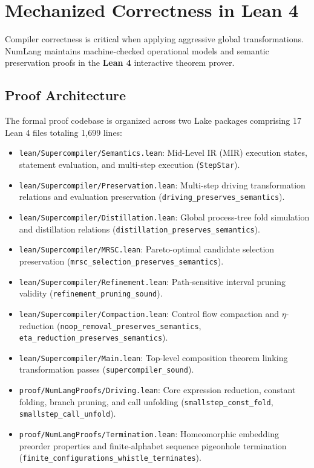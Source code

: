 \section{Mechanized Correctness in Lean 4}
\label{sec:correctness}

Compiler correctness is critical when applying aggressive global transformations. NumLang maintains machine-checked operational models and semantic preservation proofs in the \textbf{Lean 4} interactive theorem prover.

\subsection{Proof Architecture}
The formal proof codebase is organized across two Lake packages comprising 17 Lean 4 files totaling 1,699 lines:
\begin{itemize}
    \item \texttt{lean/Supercompiler/Semantics.lean}: Mid-Level IR (MIR) execution states, statement evaluation, and multi-step execution (\texttt{StepStar}).
    \item \texttt{lean/Supercompiler/Preservation.lean}: Multi-step driving transformation relations and evaluation preservation (\texttt{driving\_preserves\_semantics}).
    \item \texttt{lean/Supercompiler/Distillation.lean}: Global process-tree fold simulation and distillation relations (\texttt{distillation\_preserves\_semantics}).
    \item \texttt{lean/Supercompiler/MRSC.lean}: Pareto-optimal candidate selection preservation (\texttt{mrsc\_selection\_preserves\_semantics}).
    \item \texttt{lean/Supercompiler/Refinement.lean}: Path-sensitive interval pruning validity (\texttt{refinement\_pruning\_sound}).
    \item \texttt{lean/Supercompiler/Compaction.lean}: Control flow compaction and $\eta$-reduction (\texttt{noop\_removal\_preserves\_semantics}, \texttt{eta\_reduction\_preserves\_semantics}).
    \item \texttt{lean/Supercompiler/Main.lean}: Top-level composition theorem linking transformation passes (\texttt{supercompiler\_sound}).
    \item \texttt{proof/NumLangProofs/Driving.lean}: Core expression reduction, constant folding, branch pruning, and call unfolding (\texttt{smallstep\_const\_fold}, \texttt{smallstep\_call\_unfold}).
    \item \texttt{proof/NumLangProofs/Termination.lean}: Homeomorphic embedding preorder properties and finite-alphabet sequence pigeonhole termination (\texttt{finite\_configurations\_whistle\_terminates}).
\end{itemize}

